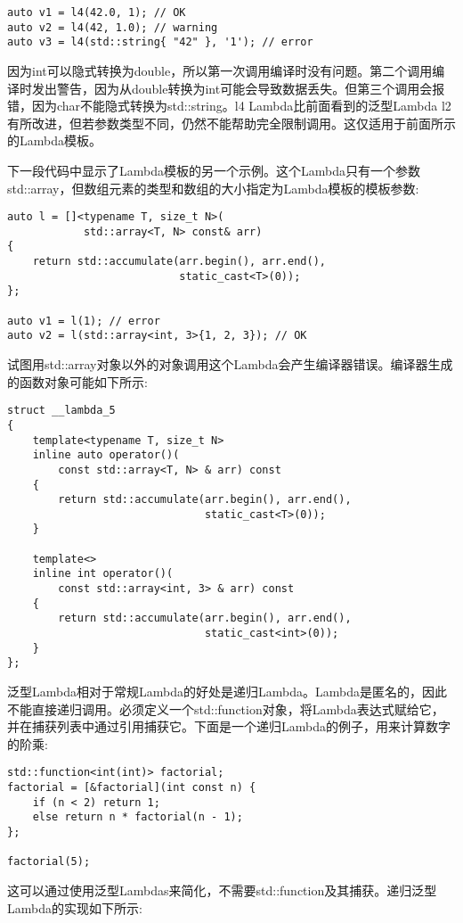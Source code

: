 \begin{lstlisting}[style=styleCXX]
auto v1 = l4(42.0, 1); // OK
auto v2 = l4(42, 1.0); // warning
auto v3 = l4(std::string{ "42" }, '1'); // error
\end{lstlisting}

因为int可以隐式转换为double，所以第一次调用编译时没有问题。第二个调用编译时发出警告，因为从double转换为int可能会导致数据丢失。但第三个调用会报错，因为char不能隐式转换为std::string。l4 Lambda比前面看到的泛型Lambda l2有所改进，但若参数类型不同，仍然不能帮助完全限制调用。这仅适用于前面所示的Lambda模板。

下一段代码中显示了Lambda模板的另一个示例。这个Lambda只有一个参数std::array，但数组元素的类型和数组的大小指定为Lambda模板的模板参数:

\begin{lstlisting}[style=styleCXX]
auto l = []<typename T, size_t N>(
            std::array<T, N> const& arr)
{
	return std::accumulate(arr.begin(), arr.end(),
	                       static_cast<T>(0));
};

auto v1 = l(1); // error
auto v2 = l(std::array<int, 3>{1, 2, 3}); // OK
\end{lstlisting}

试图用std::array对象以外的对象调用这个Lambda会产生编译器错误。编译器生成的函数对象可能如下所示:

\begin{lstlisting}[style=styleCXX]
struct __lambda_5
{
	template<typename T, size_t N>
	inline auto operator()(
		const std::array<T, N> & arr) const
	{
		return std::accumulate(arr.begin(), arr.end(),
							   static_cast<T>(0));
	}

	template<>
	inline int operator()(
		const std::array<int, 3> & arr) const
	{
		return std::accumulate(arr.begin(), arr.end(),
							   static_cast<int>(0));
	}
};
\end{lstlisting}

泛型Lambda相对于常规Lambda的好处是递归Lambda。Lambda是匿名的，因此不能直接递归调用。必须定义一个std::function对象，将Lambda表达式赋给它，并在捕获列表中通过引用捕获它。下面是一个递归Lambda的例子，用来计算数字的阶乘:

\begin{lstlisting}[style=styleCXX]
std::function<int(int)> factorial;
factorial = [&factorial](int const n) {
	if (n < 2) return 1;
	else return n * factorial(n - 1);
};

factorial(5);
\end{lstlisting}

这可以通过使用泛型Lambdas来简化，不需要std::function及其捕获。递归泛型Lambda的实现如下所示:

